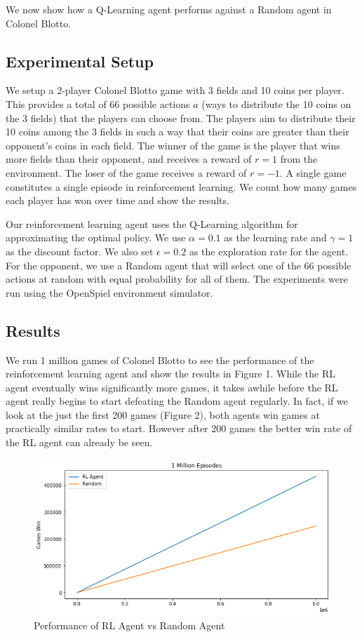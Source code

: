\documentclass[11pt, oneside]{article}   	%
\begin{document}
We now show how a Q-Learning agent performs against a Random agent in Colonel Blotto.

\subsection{Experimental Setup}

We setup a 2-player Colonel Blotto game with 3 fields and 10 coins per player. This provides a total of 66 possible actions $a$ (ways to distribute the 10 coins on the 3 fields) that the players can choose from. The players aim to distribute their 10 coins among the 3 fields in such a way that their coins are greater than their opponent's coins in each field. The winner of the game is the player that wins more fields than their opponent, and receives a reward of $r=1$ from the environment. The loser of the game receives a reward of $r=-1$. A single game constitutes a single episode in reinforcement learning. We count how many games each player has won over time and show the results.

\hfill

Our reinforcement learning agent uses the Q-Learning algorithm for approximating the optimal policy. We use $\alpha=0.1$ as the learning rate and $\gamma=1$ as the discount factor. We also set $\epsilon=0.2$ as the exploration rate for the agent. For the opponent, we use a Random agent that will select one of the 66 possible actions at random with equal probability for all of them. The experiments were run using the OpenSpiel\cite{OpenSpiel} environment simulator.


\subsection{Results}

We run 1 million games of Colonel Blotto to see the performance of the reinforcement learning agent and show the results in Figure 1. While the RL agent eventually wins significantly more games, it takes awhile before the RL agent really begins to start defeating the Random agent regularly. In fact, if we look at the just the first 200 games (Figure 2), both agents win games at practically similar rates to start. However after 200 games the better win rate of the RL agent can already be seen.

\begin{figure}[h]
    \centering
    \includegraphics[scale=0.5]{./images/rl_random.png}
    \caption{Performance of RL Agent vs Random Agent}
    \label{fig:mesh1}
\end{figure}
\end{document}
